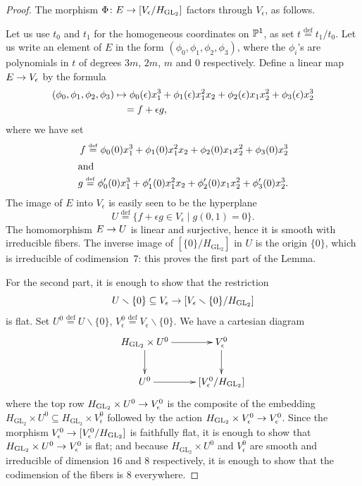 \documentclass{amsart}
\numberwithin{equation}{section}
\numberwithin{subsection}{section}
\theoremstyle{definition}
\theoremstyle{remark}
\newcommand\arr{\ifinner\to\else\longrightarrow\fi}
\newcommand\arrto{\ifinner\mapsto\else\longmapsto\fi}
\newcommand\eqdef{\overset{\mathrm{\scriptscriptstyle def}} =}
\renewcommand{\setminus}{\smallsetminus}
\newcommand{\GL}{\mathrm{GL}}
\newcommand\Hg{H_{\GL_2}}
\newcommand\Ve{V_{\epsilon}}
\begin{document}
\begin{proof}
The morphism $\Phi\colon E \arr [\Ve/\Hg]$ factors through $\Ve$, as follows.

Let us use $t_{0}$ and $t_{1}$ for the homogeneous coordinates on $\mathbb{P}^{1}$, as set $t \eqdef t_{1}/t_{0}$. Let us write an element of $E$ in the form $(\phi_{0}, \phi_{1}, \phi_{2}, \phi_{3})$, where the $\phi_{i}$'s are polynomials in $t$ of degrees $3m$, $2m$, $m$ and $0$ respectively. Define a linear map $E \arr \Ve$ by the formula
   \begin{align*}
   (\phi_{0}, \phi_{1}, \phi_{2}, \phi_{3}) &\arrto
   \phi_{0}(\epsilon)x_{1}^{3} + \phi_{1}(\epsilon)x_{1}^{2}x_{2}
      +\phi_{2}(\epsilon)x_{1}x_{2}^{2}
      +\phi_{3}(\epsilon)x_{2}^{3}\\
   &\quad = f + \epsilon g,
   \end{align*}
where we have set
   \begin{align*}
   f \eqdef \phi_{0}(0)x_{1}^{3} + \phi_{1}(0)x_{1}^{2}x_{2}
      +\phi_{2}(0)x_{1}x_{2}^{2}
      +\phi_{3}(0)x_{2}^{3}\\
\intertext{and}
   g \eqdef \phi_{0}'(0)x_{1}^{3} + \phi_{1}'(0)x_{1}^{2}x_{2}
      +\phi_{2}'(0)x_{1}x_{2}^{2}
      +\phi_{3}'(0)x_{2}^{3}.
   \end{align*}
The image of $E$ into $V_{\epsilon}$ is easily seen to be the hyperplane
   \[
   U \eqdef \{f+\epsilon g \in \Ve\mid g(0,1) = 0\}.
   \]
The homomorphism $E \arr U$ is linear and surjective, hence it is smooth with irreducible fibers. The inverse image of $[\{0\}/\Hg]$ in $U$ is the origin $\{0\}$, which is irreducible of codimension~$7$: this proves the first part of the Lemma.

For the second part, it is enough to show that the restriction
   \[
   U\setminus\{0\} \subseteq \Ve\arr [\Ve\setminus\{0\}/\Hg]
   \]
is flat. Set $U^{0} \eqdef U\setminus\{0\}$, $\Ve^{0} \eqdef \Ve \setminus \{0\}$. We have a cartesian diagram
   \[
   \xymatrix{
   \Hg \times U^{0} \ar[r]\ar[d]& \Ve^{0} \ar[d]\\
   U^{0} \ar[r] &[\Ve^{0}/\Hg]
   }
   \]
where the top row $\Hg \times U^{0} \arr \Ve^{0}$ is the composite of the embedding $\Hg \times U^{0} \subseteq \Hg \times \Ve^{0}$ followed by the action $\Hg\times \Ve^{0} \arr \Ve^{0}$. Since the morphism $\Ve^{0} \arr [\Ve^{0}/\Hg]$ is faithfully flat, it is enough to show that $\Hg \times U^{0} \arr \Ve^{0}$ is flat; and because $\Hg \times U^{0}$ and $\Ve^{0}$ are smooth and irreducible of dimension $16$ and $8$ respectively, it is enough to show that the codimension of the fibers is $8$ everywhere. 


\end{proof}
\end{document}
